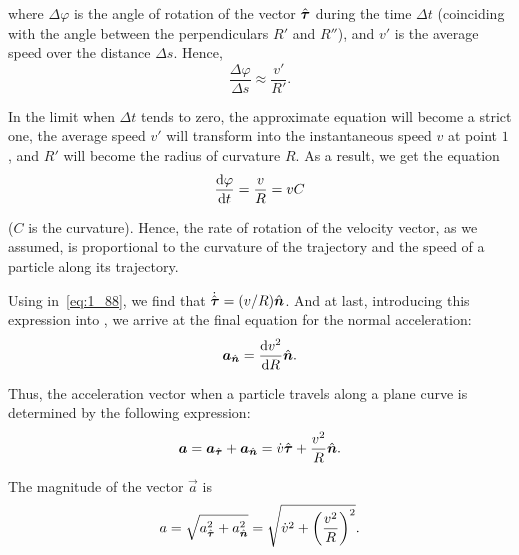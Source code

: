 \noindent
where $\Delta\varphi$ is the angle of rotation of the vector $\hat{\boldsymbol{\tau}}$ during the time $\Delta t$ (coinciding with the angle between the perpendiculars $R'$ and $R''$), and $v'$ is the average speed over the distance $\Delta s$. Hence,
\begin{equation*}
\frac{\Delta\varphi}{\Delta s} \approx \frac{v'}{R'}.
\end{equation*}

\noindent
In the limit when $\Delta t$ tends to zero, the approximate equation will become a strict one, the average speed $v'$ will transform into the instantaneous speed $v$ at point $1$, and $R'$ will become the radius of curvature $R$. As a result, we get the equation
\begin{equation}\label{eq:1_89}
\frac{\mathrm{d}\varphi}{\mathrm{d} t} = \frac{v}{R} = vC
\end{equation}

\noindent
($C$ is the curvature). Hence, the rate of rotation of the velocity vector, as we assumed, is proportional to the curvature of the trajectory and the speed of a particle along its trajectory.

Using  in~\eqref{eq:1_88}, we find that $\dot{\hat{\boldsymbol{\tau}}}=(v/R)\hat{\boldsymbol{n}}$. And at last, introducing this expression into , we arrive at the final equation for the normal acceleration:
\vspace{-12pt}
\begin{equation}\label{eq:1_90}
\boldsymbol{a}_{\hat{\boldsymbol{n}}} = \frac{\mathrm{d} v^2}{\mathrm{d} R}\hat{\boldsymbol{n}}.
\end{equation}

Thus, the acceleration vector when a particle travels along a plane curve is determined by the following expression:
\begin{equation}\label{eq:1_91}
\boldsymbol{a} = \boldsymbol{a}_{\hat{\boldsymbol{\tau}}} + \boldsymbol{a}_{\hat{\boldsymbol{n}}} = \dot{v}\hat{\boldsymbol{\tau}} + \frac{v^2}{R}\hat{\boldsymbol{n}}.
\end{equation}

\noindent
The magnitude of the vector $\vec{a}$ is
\begin{equation}\label{eq:1_92}
a = \sqrt{a_{\hat{\boldsymbol{\tau}}}^2 + a_{\hat{\boldsymbol{n}}}^2} = \sqrt{\dot{v}^2 + \left(\frac{v^2}{R}\right)^2}.
\end{equation}

